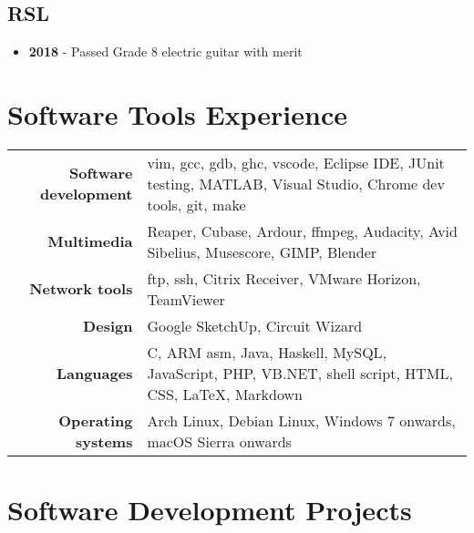 \documentclass{article}
\begin{document}
\subsection{RSL}
\begin{itemize}[noitemsep]

\item \textbf{2018} - Passed Grade 8 electric guitar with merit

\end{itemize}



\section{Software Tools Experience}

\renewcommand{\arraystretch}{1.4}

\begin{tabular}{ r | p{13cm} }

{\large\bfseries Software development} & {vim, gcc, gdb, ghc, vscode, Eclipse IDE, JUnit testing, MATLAB, Visual Studio, Chrome dev tools, git, make}\\
{\large\bfseries Multimedia} & {Reaper, Cubase, Ardour, ffmpeg, Audacity, Avid Sibelius, Musescore, GIMP, Blender} \\
{\large\bfseries Network tools} & {ftp, ssh, Citrix Receiver, VMware Horizon, TeamViewer} \\
{\large\bfseries Design} & {Google SketchUp, Circuit Wizard} \\
{\large\bfseries Languages} & {C, ARM asm, Java, Haskell, MySQL, JavaScript, PHP, VB.NET, shell script, HTML, CSS, \LaTeX, Markdown}\\
{\large\bfseries Operating systems} & {Arch Linux, Debian Linux, Windows 7 onwards, macOS Sierra onwards}\\
\end{tabular}




\section{Software Development Projects}
\end{document}
